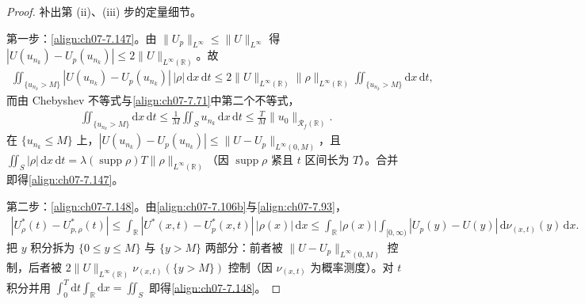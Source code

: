 \documentclass[../../main.tex]{subfiles}%
\begin{document}
\begin{proof}
补出第 (ii)、(iii) 步的定量细节。

第一步：\eqref{align:ch07-7.147}。由 $\|U_p\|_{L^\infty}\leqslant\|U\|_{L^\infty}$ 得 $|U(u_{n_k})-U_p(u_{n_k})|\leqslant2\|U\|_{L^\infty(\mathbb{R})}$。故
\begin{align*}
\iint_{\{u_{n_k}>M\}}|U(u_{n_k})-U_p(u_{n_k})|\,|\rho|\,\mathrm{d}x\,\mathrm{d}t
\leqslant2\|U\|_{L^\infty(\mathbb{R})}\|\rho\|_{L^\infty(\mathbb{R})}\iint_{\{u_{n_k}>M\}}\!\!\mathrm{d}x\,\mathrm{d}t,
\end{align*}
而由 Chebyshev 不等式与\eqref{align:ch07-7.71}中第二个不等式，
\begin{align*}
\iint_{\{u_{n_k}>M\}}\mathrm{d}x\,\mathrm{d}t\leqslant\frac1M\iint_Su_{n_k}\,\mathrm{d}x\,\mathrm{d}t\leqslant\frac{T}{M}\|u_0\|_{\mathscr{R}_f(\mathbb{R})}.
\end{align*}
在 $\{u_{n_k}\leqslant M\}$ 上，$|U(u_{n_k})-U_p(u_{n_k})|\leqslant\|U-U_p\|_{L^\infty(0,M)}$，且 $\iint_S|\rho|\,\mathrm{d}x\,\mathrm{d}t=\lambda(\operatorname{supp}\rho)T\|\rho\|_{L^\infty(\mathbb{R})}$（因 $\operatorname{supp}\rho$ 紧且 $t$ 区间长为 $T$）。合并即得\eqref{align:ch07-7.147}。

第二步：\eqref{align:ch07-7.148}。由\eqref{align:ch07-7.106b}与\eqref{align:ch07-7.93}，
\begin{align*}
|U_\rho^*(t)-U_{p,\rho}^*(t)|\leqslant\int_{\mathbb{R}}|U^*(x,t)-U_p^*(x,t)|\,|\rho(x)|\,\mathrm{d}x
\leqslant\int_{\mathbb{R}}|\rho(x)|\int_{[0,\infty)}|U_p(y)-U(y)|\,\mathrm{d}\nu_{(x,t)}(y)\,\mathrm{d}x.
\end{align*}
把 $y$ 积分拆为 $\{0\leqslant y\leqslant M\}$ 与 $\{y>M\}$ 两部分：前者被 $\|U-U_p\|_{L^\infty(0,M)}$ 控制，后者被 $2\|U\|_{L^\infty(\mathbb{R})}\nu_{(x,t)}(\{y>M\})$ 控制（因 $\nu_{(x,t)}$ 为概率测度）。对 $t$ 积分并用 $\int_0^T\mathrm{d}t\int_{\mathbb{R}}\mathrm{d}x=\iint_S$ 即得\eqref{align:ch07-7.148}。


\end{proof}
\end{document}
